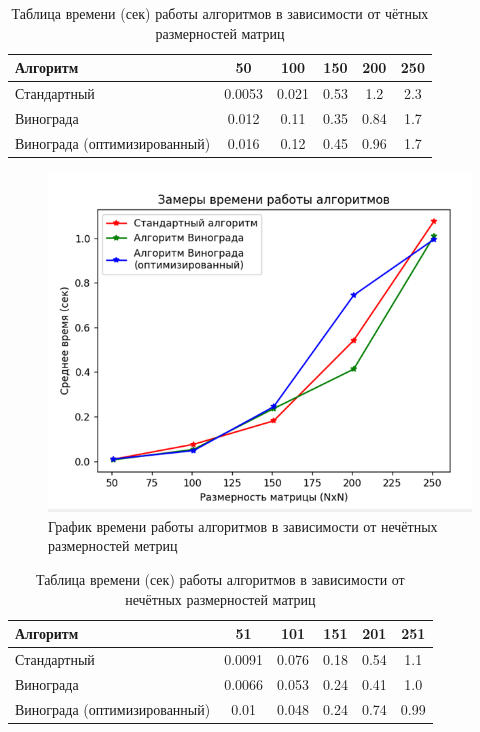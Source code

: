 \begin{table}[H]
    \centering
    \caption{Таблица времени (сек) работы алгоритмов в зависимости от чётных размерностей матриц}
    \begin{tabular}{|l|c|c|c|c|c|}
        \hline
        \textbf{Алгоритм} & \textbf{50} & \textbf{100} & \textbf{150} & \textbf{200} & \textbf{250}\\
        \hline
        Стандартный & 0.0053 & 0.021 & 0.53 & 1.2 & 2.3 \\
        Винограда & 0.012 & 0.11 & 0.35 & 0.84 & 1.7 \\
        Винограда (оптимизированный) & 0.016 & 0.12 & 0.45 & 0.96 & 1.7 \\
        \hline
    \end{tabular}
    \label{table:table_even}
\end{table}

\begin{figure}[H]
    \centering
    \includegraphics[width=1\textwidth]{img/graph_odd.png}
    \caption{График времени работы алгоритмов в зависимости от нечётных размерностей метриц}
    \label{fig:graph_odd} %
\end{figure}

\begin{table}[H]
    \centering
    \caption{Таблица времени (сек) работы алгоритмов в зависимости от нечётных размерностей матриц}
    \begin{tabular}{|l|c|c|c|c|c|}
        \hline
        \textbf{Алгоритм} & \textbf{51} & \textbf{101} & \textbf{151} & \textbf{201} & \textbf{251}\\
        \hline
        Стандартный & 0.0091 & 0.076 & 0.18 & 0.54 & 1.1 \\
        Винограда & 0.0066 & 0.053 & 0.24 & 0.41 & 1.0 \\
        Винограда (оптимизированный) & 0.01 & 0.048 & 0.24 & 0.74 & 0.99 \\
        \hline
    \end{tabular}
    \label{table:table_odd}
\end{table}

